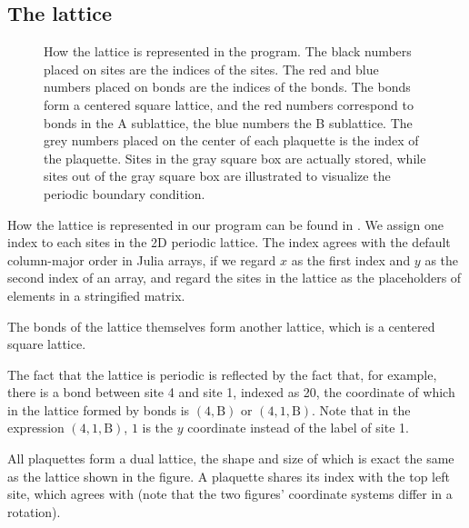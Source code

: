 \documentclass[hyperref, a4paper]{article}
\begin{document}
\subsection{The lattice}

\begin{figure}
    
    \caption{How the lattice is represented in the program. 
    The black numbers placed on sites are the indices of the sites.
    The red and blue numbers placed on bonds are the indices of the bonds. The bonds form a centered square lattice, and the red numbers correspond to bonds in the A sublattice, the blue numbers the B sublattice.
    The grey numbers placed on the center of each plaquette is the index of the plaquette.
    Sites in the gray square box are actually stored, while sites out of the gray square box are illustrated to visualize the periodic boundary condition.}
    \label{fig:label-representation}
\end{figure}

How the lattice is represented in our program can be found in .
We assign one index to each sites in the 2D periodic lattice.
The index agrees with the default column-major order in Julia arrays, if we regard $x$ as the first index and $y$ as the second index of an array, and regard the sites in the lattice as the placeholders of elements in a stringified matrix.

The bonds of the lattice themselves form another lattice, which is a centered square lattice.

The fact that the lattice is periodic is reflected by the fact that, for example, there is a bond between site 4 and site 1, indexed as 20, the coordinate of which in the lattice formed by bonds is $(4, \text{B})$ or $(4, 1, \text{B})$.
Note that in the expression $(4, 1, \text{B})$, $1$ is the $y$ coordinate instead of the label of site 1.

All plaquettes form a dual lattice, the shape and size of which is exact the same as the lattice shown in the figure.
A plaquette shares its index with the top left site, 
which agrees with  (note that the two figures' coordinate systems differ in a rotation).
\end{document}

